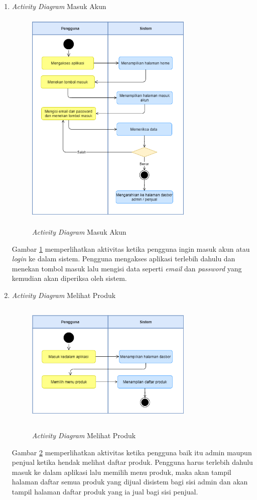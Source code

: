 \begin{enumerate}
	\item \textit{Activity Diagram} Masuk Akun
	\begin{figure}[H]
		\centering
		{\includegraphics [width = 8cm, height= 10.5cm]{gambar/activity diagram/masuk akun}}
		\caption{\textit{Activity Diagram} Masuk Akun}
		\label{masuk akun}
	\end{figure}
	\par Gambar \ref*{masuk akun} memperlihatkan aktivitas ketika pengguna ingin masuk akun atau \textit{login} ke dalam sistem. Pengguna mengakses aplikasi terlebih dahulu dan menekan tombol masuk lalu mengisi data seperti \textit{email} dan \textit{password} yang kemudian akan diperiksa oleh sistem.

	\item \textit{Activity Diagram} Melihat Produk
	\begin{figure}[H]
		\centering
		{\includegraphics [width = 8cm, height= 6cm]{gambar/activity diagram/lihat produk}}
		\caption{\textit{Activity Diagram} Melihat Produk}
		\label{lihat produk}
	\end{figure}
	\par Gambar \ref*{lihat produk} memperlihatkan aktivitas ketika pengguna baik itu admin maupun penjual ketika hendak melihat daftar produk. Pengguna harus terlebih dahulu masuk ke dalam aplikasi lalu memilih menu produk, maka akan tampil halaman daftar semua produk yang dijual disistem bagi sisi admin dan akan tampil halaman daftar produk yang ia jual bagi sisi penjual.


\end{enumerate}
